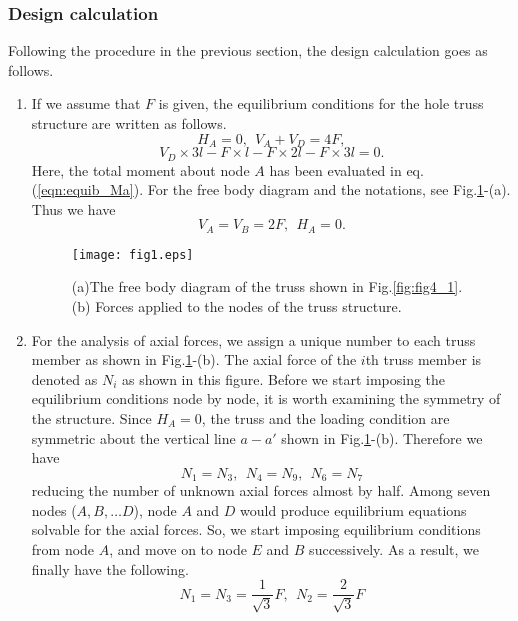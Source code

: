 \documentclass[10pt,a4j]{article}
\begin{document}
\subsubsection{Design calculation}
Following the procedure in the previous section, the design calculation goes as follows.  
\begin{enumerate}
\item
	If we assume that $F$ is given, the equilibrium conditions for the hole truss 
	structure are written as follows.
	\begin{equation}
		H_A=0, \ \ V_A+V_D=4F, 
		\label{eqn:equib_fs}
	\end{equation}
	\begin{equation}
		V_D\times 3l - F\times l-F\times 2l-F\times 3l=0.
		\label{eqn:equib_Ma}
	\end{equation}
	Here, the total moment about node $A$ has been evaluated in eq.(\ref{eqn:equib_Ma}).
	For the free body diagram and the notations, see Fig.\ref{fig:fig1}-(a).
	Thus we have 
	\begin{equation}
		V_A=V_B=2F, \ \ H_A=0.
		\label{eqn:reac_fs}
	\end{equation}
\begin{figure}[h]
	\begin{center}
	\texttt{[image: fig1.eps]} 
	\end{center}
	\caption{(a)The free body diagram of the truss shown in Fig.\ref{fig:fig4_1}. 
	(b) Forces applied to the nodes of the truss structure.} 
	\label{fig:fig1}
\end{figure}
\item
	For the analysis of axial forces, we assign a unique number to 
	each truss member as shown in Fig.\ref{fig:fig1}-(b).
	The axial force of the $i$th truss member is denoted as $N_i$ as shown in this figure.
	Before we start imposing the equilibrium conditions node by node, it is worth examining 
	the symmetry of the structure. 
	Since $H_A=0$, the truss and the loading condition are symmetric about the vertical 
	line $a-a'$ shown in Fig.\ref{fig:fig1}-(b). 
	Therefore we have 	
	\[
		N_1=N_3, \ \ N_4=N_9,\ \  N_6=N_7
	\]
	reducing the number of unknown axial forces almost by half.
	Among seven nodes ($A,B,\dots D$), node $A$ and $D$ would produce 
	equilibrium equations solvable for the axial forces. So, we start imposing 
	equilibrium conditions from node $A$, and move on to node $E$ and $B$ successively. 
	As a result, we finally have the following. 
	\[
		N_1=N_3=\frac{1}{\sqrt{3}}F ,\ \ N_2=\frac{2}{\sqrt{3}}F
	\]

\end{enumerate}
\end{document}
